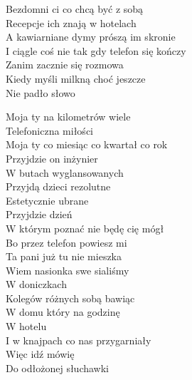 
\begin{text}
    Bezdomni ci co chcą być z sobą\\
    Recepcje ich znają w hotelach\\
    A kawiarniane dymy prószą im skronie\\
    I ciągle coś nie tak gdy telefon się kończy\\
    Zanim zacznie się rozmowa\\
    Kiedy myśli milkną choć jeszcze\\
    Nie padło słowo

    Moja ty na kilometrów wiele\\
    Telefoniczna miłości\\
    Moja ty co miesiąc co kwartał co rok\\
    Przyjdzie on inżynier\\
    W butach wyglansowanych\\
    Przyjdą dzieci rezolutne\\
    Estetycznie ubrane\\
    Przyjdzie dzień\\
    W którym poznać nie będę cię mógł\\
    Bo przez telefon powiesz mi\\
    Ta pani już tu nie mieszka\\
    Wiem nasionka swe sialiśmy\\
    W doniczkach\\
    Kolegów różnych sobą bawiąc\\
    W domu który na godzinę\\
    W hotelu\\
    I w knajpach co nas przygarniały\\
    Więc idź mówię\\
    Do odłożonej słuchawki
\end{text}
\begin{chord}

\end{chord}